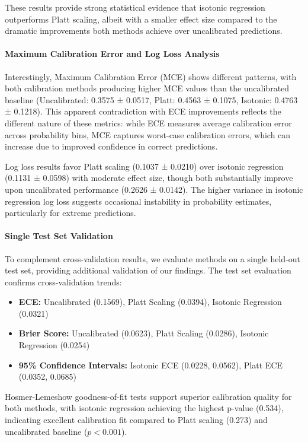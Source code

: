 \documentclass[12pt, a4paper]{article}
\begin{document}
These results provide strong statistical evidence that isotonic regression outperforms Platt scaling, albeit with a smaller effect size compared to the dramatic improvements both methods achieve over uncalibrated predictions.

\paragraph{Maximum Calibration Error and Log Loss Analysis}

Interestingly, Maximum Calibration Error (MCE) shows different patterns, with both calibration methods producing higher MCE values than the uncalibrated baseline (Uncalibrated: 0.3575 ± 0.0517, Platt: 0.4563 ± 0.1075, Isotonic: 0.4763 ± 0.1218). This apparent contradiction with ECE improvements reflects the different nature of these metrics: while ECE measures average calibration error across probability bins, MCE captures worst-case calibration errors, which can increase due to improved confidence in correct predictions.

Log loss results favor Platt scaling (0.1037 ± 0.0210) over isotonic regression (0.1131 ± 0.0598) with moderate effect size, though both substantially improve upon uncalibrated performance (0.2626 ± 0.0142). The higher variance in isotonic regression log loss suggests occasional instability in probability estimates, particularly for extreme predictions.

\paragraph{Single Test Set Validation}

To complement cross-validation results, we evaluate methods on a single held-out test set, providing additional validation of our findings. The test set evaluation confirms cross-validation trends:

\begin{itemize}
    \item \textbf{ECE:} Uncalibrated (0.1569), Platt Scaling (0.0394), Isotonic Regression (0.0321)
    \item \textbf{Brier Score:} Uncalibrated (0.0623), Platt Scaling (0.0286), Isotonic Regression (0.0254)
    \item \textbf{95\% Confidence Intervals:} Isotonic ECE (0.0228, 0.0562), Platt ECE (0.0352, 0.0685)
\end{itemize}

Hosmer-Lemeshow goodness-of-fit tests support superior calibration quality for both methods, with isotonic regression achieving the highest p-value (0.534), indicating excellent calibration fit compared to Platt scaling (0.273) and uncalibrated baseline ($p < 0.001$).
\end{document}
